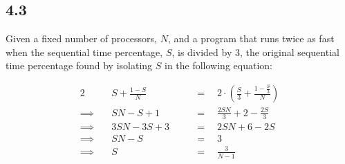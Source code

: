 \documentclass[11pt, letterpaper]{article}
\begin{document}
\pagebreak
\subsection*{4.3}

Given a fixed number of processors, $N$, and a program that runs twice as fast when the sequential time percentage, $S$, is divided by 3, the original sequential time percentage found by isolating $S$ in the following equation:

\begin{alignat*}{2}
            & \quad S + \frac{1-S}{N} \quad &&= \quad 2 \cdot \left(\frac{S}{3} + \frac{1-\frac{S}{3}}{N}\right)\\
    \implies& \quad SN - S + 1 \quad        &&= \quad \frac{2SN}{3} + 2 - \frac{2S}{3}\\
    \implies& \quad 3SN - 3S + 3 \quad      &&= \quad 2SN + 6 - 2S\\
    \implies& \quad SN - S \quad            &&= \quad 3\\
    \implies& \quad S \quad                 &&= \quad \frac{3}{N - 1}\\
\end{alignat*}
\end{document}
